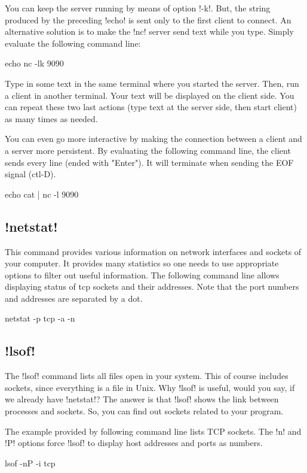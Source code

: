 \documentclass[a4paper,10pt,twoside]{book}
\begin{document}
You can keep the server running by means of option \ct!-k!.
But, the string produced by the preceding \ct!echo! is sent only to the first client to connect.
An alternative solution is to make the \ct!nc! server send text while you type.
Simply evaluate the following command line:
\begin{code}{}
echo nc -lk 9090 
\end{code}

Type in some text in the same terminal where you started the server.
Then, run a client in another terminal.
Your text will be displayed on the client side.
You can repeat these two last actions (type text at the server side, then start client) as many times as needed.

You can even go more interactive by making the connection between a client and a server more persistent.
By evaluating the following command line, the client sends every line (ended with "Enter").
It will terminate when sending the EOF signal (ctl-D).
\begin{code}{}
echo cat | nc -l 9090 
\end{code}


\subsection{\ct!netstat!}
This command provides various information on network interfaces and sockets of your computer.
It provides many statistics so one needs to use appropriate options to filter out useful information.
The following command line allows displaying status of tcp sockets and their addresses.
Note that the port numbers and addresses are separated by a dot.
\begin{code}{}
netstat -p tcp -a -n
\end{code}
 
\subsection{\ct!lsof!}
The \ct!lsof! command lists all files open in your system.
This of course includes sockets, since everything is a file in Unix.
Why \ct!lsof! is useful, would you say, if we already have \ct!netstat!?
The answer is that \ct!lsof! shows the link between processes and sockets.
So, you can find out sockets related to your program.

The example provided by following command line lists TCP sockets.
The \ct!n! and \ct!P! options force \ct!lsof! to display host addresses and ports as numbers. 
\begin{code}{}
lsof -nP -i tcp
\end{code}
\end{document}
